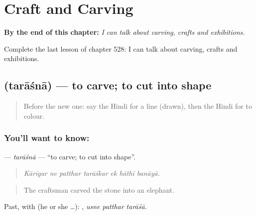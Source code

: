 
\chapter{Craft and Carving}
\label{ch:hi-craft-and-carving}

\begin{chapteropening}
\textbf{By the end of this chapter:} \emph{I can talk about carving, crafts and exhibitions.}

Complete the last lesson of chapter 528: I can talk about carving, crafts and exhibitions.
\end{chapteropening}

\section[\texorpdfstring{\hi{तराशना} (tarāśnā)}{तराशना (tarāśnā)}]{ (tarāśnā) — to carve; to cut into shape}

\label{lesson:HI-C528-tarasna}



\begin{quote}
Before the new one: say the Hindi for a line (drawn), then the Hindi for to colour.
\end{quote}

\subsection*{You'll want to know: }
\textbf{} — \emph{tarāśnā} — \textquotedblleft{}to carve; to cut into shape\textquotedblright{}.

\begin{quote}
      
\end{quote}

\begin{quote}
\emph{Kārīgar ne patthar tarāśkar ek hāthī banāyā.}
\end{quote}

\begin{quote}
The craftsman carved the stone into an elephant.
\end{quote}

Past, with  (he or she …):   , \emph{usne patthar tarāśā}.

